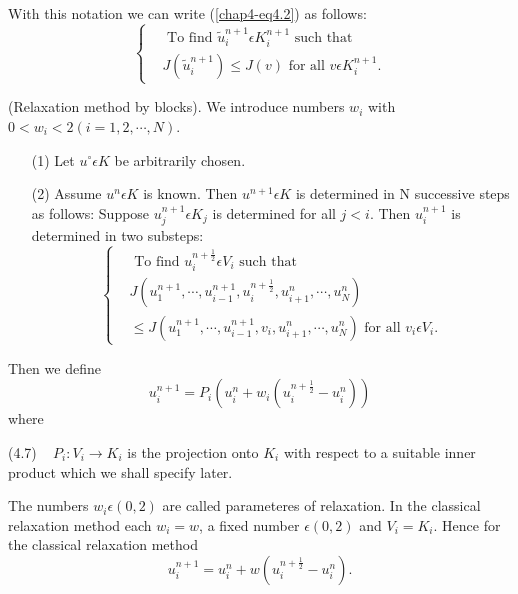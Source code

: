 With this notation we can write (\ref{chap4-eq4.2}) as follows:
\begin{equation*}
\begin{cases}
& \text{ To find } \widetilde{u}_{i}^{n+1} \epsilon K_{i}^{n+1} \text{ such that }\\
& J(\widetilde{u}_{i}^{n+1}) \leq J(v) \text{ for all } v \epsilon K_{i}^{n+1}.\tag*{$(4.2)'$}\label{chap4-eq4.2'}
\end{cases}
\end{equation*}

\medskip
{} (Relaxation method by blocks). We introduce numbers $w_{i}$ with $0 < w_{i} < 2 (i = 1, 2, \cdots, N)$.
\begin{enumerate}
\item[(1)] Let $u^{\circ} \epsilon K$ be arbitrarily chosen.
\item[(2)] Assume $u^{n} \epsilon K$ is known. Then $u^{n+1} \epsilon K$ is determined in N successive steps as follows: Suppose $u_{j}^{n+1} \epsilon K_{j}$ is determined for all $j < i$. Then $u_{i}^{n+1}$ is determined in two substeps:
\begin{equation*}
\begin{cases}
& \text{ To find } u_{i}^{n+\frac{1}{2}} \epsilon V_{i} \text{ such that }\\
& J(u_{1}^{n+1}, \cdots, u_{i-1}^{n+1}, u_{i}^{n+\frac{1}{2}}, u_{i+1}^{n}, \cdots, u_{N}^{n})\\
& \leq J(u_{1}^{n+1}, \cdots, u_{i-1}^{n+1}, v_{i}, u_{i+1}^{n}, \cdots, u_{N}^{n}) \text{ for all } v_{i} \epsilon V_{i}.\tag{4.5}\label{chap4-eq4.5}
\end{cases}
\end{equation*}
\end{enumerate}

Then we define
\begin{equation*}
u_{i}^{n+1} = P_{i} (u_{i}^{n} + w_{i} (u_{i}^{n+\frac{1}{2}} - u_{i}^{n}))\tag{4.6}\label{chap4-eq4.6}
\end{equation*}
where

\medskip
\noindent
(4.7) ~ $P_{i} : V_{i} \to K_{i}$  is the projection onto $K_{i}$ with respect to a suitable inner product which we shall specify later.


\begin{remark}\label{chap4-rem4.1}
The numbers $w_{i} \epsilon (0, 2)$ are called parameteres of relaxation. In the classical relaxation method each $w_{i} = w$, a fixed number $\epsilon (0, 2)$ and $V_{i} = K_{i}$. Hence for the classical relaxation method
\begin{equation*}
u_{i}^{n+1} = u_{i}^{n} + w(u_{i}^{n+\frac{1}{2}}-u_{i}^{n}).\tag{4.8}\label{chap4-eq4.8}
\end{equation*}
\end{remark}\pageoriginale

